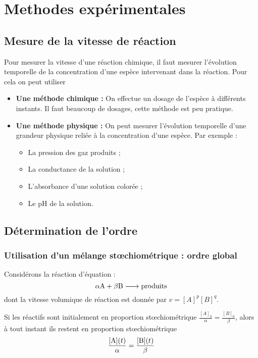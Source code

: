 \documentclass{cours}
\begin{document}
\section{Methodes expérimentales}%
\label{sec:methodes_experimentales}

\subsection{Mesure de la vitesse de réaction}%
\label{sub:mesure_de_la_vitesse_de_reaction}
Pour mesurer la vitesse d'une réaction chimique, il faut mesurer l'évolution temporelle de la concentration d'une espèce  intervenant dans la réaction. Pour cela on peut utiliser
\begin{itemize}
  \item \textbf{Une méthode chimique : } On effectue un dosage de l'espèce  à différents instants. Il faut beaucoup de dosages, cette méthode est peu pratique.
  \item \textbf{Une méthode physique : } On peut mesurer l'évolution temporelle d'une grandeur physique reliée à la concentration d'une espèce. Par exemple :
  \begin{itemize}
    \item La pression des gaz produits ;
    \item La conductance de la solution ; 
    \item L'absorbance d'une solution colorée ;
    \item Le pH de la solution.
  \end{itemize}
\end{itemize}

\subsection{Détermination de l'ordre}%
\label{sub:determination_de_l_ordre}

\subsubsection{Utilisation d'un mélange st\oe{}chiométrique : ordre global}%
\label{ssub:utilisation_d_un_melange_stchiometrique_ordre_global}
Considérons la réaction d'équation :
\[
\ce{\alpha A + \beta B -> produits}
\]
 dont la vitesse volumique de réaction est donnée par $v=[A]^p [B]^q$.

 Si les réactifs sont initialement en proportion stœchiométrique $\frac{[A]_0}{\alpha} = \frac{[B]_0}{\beta}$, alors à tout instant ils restent en proportion stœchiométrique 
%
\[
\frac{[\ce{A}](t)}{\alpha}  = \frac{[\ce{B}](t)}{\beta}
\]
\end{document}
